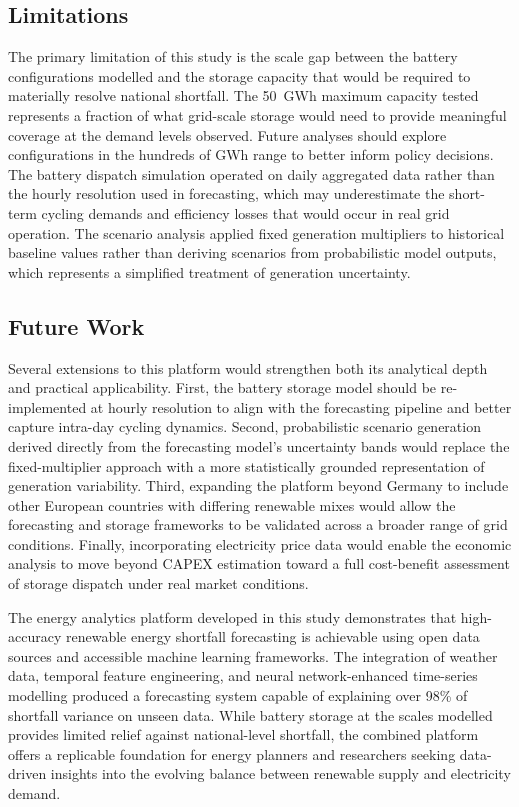 \documentclass[conference]{IEEEtran}
\begin{document}
\subsection{Limitations}
 
The primary limitation of this study is the scale gap between the battery configurations modelled and the storage capacity that would be required to materially resolve national shortfall. The 50~GWh maximum capacity tested represents a fraction of what grid-scale storage would need to provide meaningful coverage at the demand levels observed. Future analyses should explore configurations in the hundreds of GWh range to better inform policy decisions. The battery dispatch simulation operated on daily aggregated data rather than the hourly resolution used in forecasting, which may underestimate the short-term cycling demands and efficiency losses that would occur in real grid operation. The scenario analysis applied fixed generation multipliers to historical baseline values rather than deriving scenarios from probabilistic model outputs, which represents a simplified treatment of generation uncertainty.
 
\subsection{Future Work}
 
Several extensions to this platform would strengthen both its analytical depth and practical applicability. First, the battery storage model should be re-implemented at hourly resolution to align with the forecasting pipeline and better capture intra-day cycling dynamics. Second, probabilistic scenario generation derived directly from the forecasting model's uncertainty bands would replace the fixed-multiplier approach with a more statistically grounded representation of generation variability. Third, expanding the platform beyond Germany to include other European countries with differing renewable mixes would allow the forecasting and storage frameworks to be validated across a broader range of grid conditions. Finally, incorporating electricity price data would enable the economic analysis to move beyond CAPEX estimation toward a full cost-benefit assessment of storage dispatch under real market conditions.
 
The energy analytics platform developed in this study demonstrates that high-accuracy renewable energy shortfall forecasting is achievable using open data sources and accessible machine learning frameworks. The integration of weather data, temporal feature engineering, and neural network-enhanced time-series modelling produced a forecasting system capable of explaining over 98\% of shortfall variance on unseen data. While battery storage at the scales modelled provides limited relief against national-level shortfall, the combined platform offers a replicable foundation for energy planners and researchers seeking data-driven insights into the evolving balance between renewable supply and electricity demand.
\end{document}
